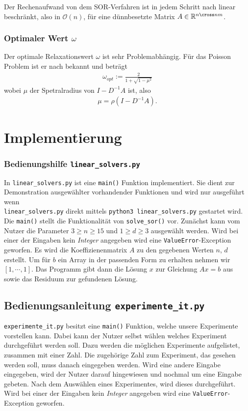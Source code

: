 \documentclass[smallheadings]{scrartcl}
\theoremstyle{definition}
\begin{document}
		Der Rechenaufwand von dem SOR-Verfahren ist in jedem Schritt nach
		 \citep{slides} linear beschränkt, also in $\mathcal{O}(n)$, für eine 
		 dünnbesetzte Matrix $A\in\mathbb{R}^{n\cross nm}$.  
		 
		 \subsubsection{Optimaler Wert $\omega$}
		 Der optimale Relaxationswert $\omega$ ist sehr Problemabhängig. Für das Poisson Problem ist er nach \citep{slides} bekannt und beträgt
		 \begin{align*}
		 \omega _{opt}:=\frac{2}{1+\sqrt{1-\mu ^2}}
		 \end{align*}
		 wobei $\mu$ der Spetralradius von $I-D^{-1}A$ ist, also 
		 \begin{align*}
		 \mu = \rho (I-D^{-1}A).
		 \end{align*}
		 
		 
		
\section{Implementierung}


\subsubsection*{Bedienungshilfe \texttt{linear\_solvers.py}}
In \texttt{linear\_solvers.py} ist eine \texttt{main()} Funktion implementiert. Sie dient zur Demonstration ausgewählter vorhandender Funktionen und
		wird nur ausgef\"uhrt wenn
		\\ \texttt{linear\_solvers.py} direkt mittels \texttt{python3 linear\_solvers.py} gestartet wird. 
 Die \texttt{main()} stellt die Funktionalität von \texttt{solve\_sor()} vor. Zunächst kann vom Nutzer die Parameter $3\geq n\geq 15$ und $1\geq d\geq 3$ ausgewählt werden. Wird bei einer der Eingaben kein \textit{Integer} angegeben wird eine \texttt{ValueError}-Exception geworfen.
 Es wird die Koeffizienenmatrix $A$ zu den gegebenen Werten $n$, $d$  erstellt. Um für $b$ ein Array in der passenden Form zu erhalten nehmen wir $[1,\cdots,1]$.
 Das Programm gibt dann die Lösung $x$ zur Gleichung $Ax=b$ aus sowie das Residuum zur gefundenen Lösung.

 \subsection*{Bedienungsanleitung \texttt{experimente\_it.py}}
 \texttt{experimente\_it.py} besitzt eine \texttt{main()} Funktion, welche unsere Experimente vorstellen kann. Dabei kann der Nutzer selbst wählen welches Experiment durchgeführt werden soll.
 Dazu werden die möglichen Experimente aufgelistet, zusammen mit einer Zahl. Die zugehörige Zahl zum Experiment, das gesehen werden soll, muss danach eingegeben werden. Wird eine andere Eingabe eingegeben, wird der Nutzer darauf hingewiesen und nochmal um eine Eingabe gebeten. Nach dem Auswählen eines Experimentes, wird dieses durchgeführt.
 Wird bei einer der Eingaben kein \textit{Integer} angegeben wird eine \texttt{ValueError}-Exception geworfen.\\
 \\
\end{document}
